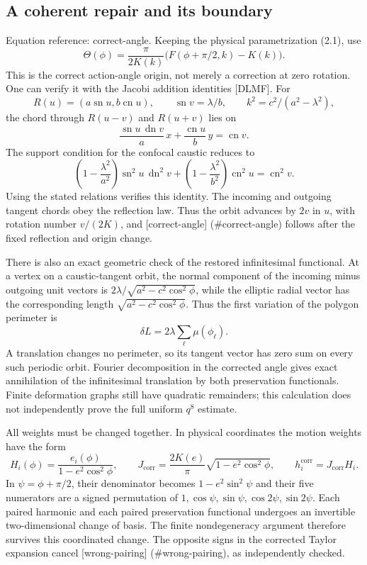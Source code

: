 \documentclass[10pt]{article}
\begin{document}
\subsection*{A coherent repair and its boundary}
Equation reference: correct-angle. Keeping the physical parametrization (2.1), use \[
 \Theta(\phi)=\frac{\pi}{2K(k)}
 \bigl(F(\phi+\pi/2,k)-K(k)\bigr).\] This is the correct action-angle origin, not merely a correction at zero rotation. One can verify it with the Jacobi addition identities [DLMF]. For \[R(u)=(a\operatorname{sn}u,b\operatorname{cn}u),\qquad
 \operatorname{sn}v=\lambda/b,\qquad k^2=c^2/(a^2-\lambda^2),\] the chord through \(R(u-v)\) and \(R(u+v)\) lies on \[\frac{\operatorname{sn}u\,\operatorname{dn}v}{a}\,x+\frac{\operatorname{cn}u}{b}\,y=\operatorname{cn}v .\] The support condition for the confocal caustic reduces to \[\left(1-\frac{\lambda^2}{a^2}\right)\operatorname{sn}^2u\,\operatorname{dn}^2v+
 \left(1-\frac{\lambda^2}{b^2}\right)\operatorname{cn}^2u=\operatorname{cn}^2v .\] Using the stated relations verifies this identity. The incoming and outgoing tangent chords obey the reflection law. Thus the orbit advances by \(2v\) in \(u\), with rotation number \(v/(2K)\), and [correct-angle] (\#correct-angle) follows after the fixed reflection and origin change.\par
There is also an exact geometric check of the restored infinitesimal functional. At a vertex on a caustic-tangent orbit, the normal component of the incoming minus outgoing unit vectors is \(2\lambda/\sqrt{a^2-c^2\cos^2\phi}\), while the elliptic radial vector has the corresponding length \(\sqrt{a^2-c^2\cos^2\phi}\). Thus the first variation of the polygon perimeter is \[\delta L=2\lambda\sum_\ell\mu(\phi_\ell).\] A translation changes no perimeter, so its tangent vector has zero sum on every such periodic orbit. Fourier decomposition in the corrected angle gives exact annihilation of the infinitesimal translation by both preservation functionals. Finite deformation graphs still have quadratic remainders; this calculation does not independently prove the full uniform \(q^8\) estimate.\par
All weights must be changed together. In physical coordinates the motion weights have the form \[H_i(\phi)=\frac{e_i(\phi)}{1-e^2\cos^2\phi},
 \qquad
 J_{\mathrm{corr}}=\frac{2K(e)}{\pi}
                   \sqrt{1-e^2\cos^2\phi},
 \qquad h_i^{\mathrm{corr}}=J_{\mathrm{corr}}H_i .\] In \(\psi=\phi+\pi/2\), their denominator becomes \(1-e^2\sin^2\psi\) and their five numerators are a signed permutation of \(1,\cos\psi,\sin\psi,\cos2\psi,\sin2\psi\). Each paired harmonic and each paired preservation functional undergoes an invertible two-dimensional change of basis. The finite nondegeneracy argument therefore survives this coordinated change. The opposite signs in the corrected Taylor expansion cancel [wrong-pairing] (\#wrong-pairing), as independently checked.\par
\end{document}
